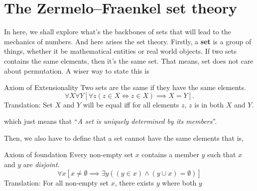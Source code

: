 \section{The Zermelo–Fraenkel set theory}

In here, we shall explore what's the backbones of sets that will lead to the mechanics of numbers. And here arises the set theory. Firstly, a \textbf{set} is a group of things, whether it be mathematical entities or real world objects. If two sets contains the same elements, then it's the same set. That means, set does not care about permutation. A wiser way to state this is
\begin{axiom}{Axiom of Extensionality}{}
    Two sets are the same if they have the same elements.
    \begin{equation}
        \forall X\forall Y[\forall z(z \in X \iff z \in X) \implies X = Y].
    \end{equation}
    Translation: Set $X$ and $Y$ will be equal iff for all elements $z$, $z$ is in both $X$ and $Y$.
\end{axiom}
which just means that ``\emph{A set is uniquely determined by its members}''.

Then, we also have to define that a set cannot have the same elements that is,
\begin{axiom}{Axiom of foundation}{}
    Every non-empty set $x$ contains a member $y$ such that $x$ and $y$ are \emph{disjoint}.
    \begin{equation}
        \forall x [x \neq \emptyset \implies \exists y((y \in x) \land (y \cup x) = \emptyset)]
    \end{equation}
    Translation: For all non-empty set $x$, there exists $y$ where both $y$
\end{axiom}